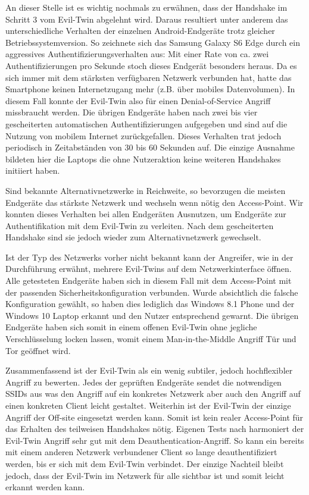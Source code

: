 An dieser Stelle ist es wichtig nochmals zu erwähnen, dass der Handshake im Schritt 3 vom Evil-Twin abgelehnt wird.
Daraus resultiert unter anderem das unterschiedliche Verhalten der einzelnen Android-Endgeräte trotz gleicher Betriebssystemversion.
So zeichnete sich das Samsung Galaxy S6 Edge durch ein aggressives Authentifizierungsverhalten aus: Mit einer Rate von ca. zwei Authentifizierungen pro Sekunde stoch dieses Endgerät besonders heraus.
Da es sich immer mit dem stärksten verfügbaren Netzwerk verbunden hat, hatte das Smartphone keinen Internetzugang mehr (z.B. über mobiles Datenvolumen).
In diesem Fall konnte der Evil-Twin also für einen Denial-of-Service Angriff missbraucht werden.
Die übrigen Endgeräte haben nach zwei bis vier gescheiterten automatischen Authentifizierungen aufgegeben und sind auf die Nutzung von mobilem Internet zurückgefallen.
Dieses Verhalten trat jedoch periodisch in Zeitabständen von 30 bis 60 Sekunden auf.
Die einzige Ausnahme bildeten hier die Laptops die ohne Nutzeraktion keine weiteren Handshakes initiiert haben.

Sind bekannte Alternativnetzwerke in Reichweite, so bevorzugen die meisten Endgeräte das stärkste Netzwerk und wechseln wenn nötig den Access-Point.
Wir konnten dieses Verhalten bei allen Endgeräten Ausnutzen, um Endgeräte zur Authentifikation mit dem Evil-Twin zu verleiten.
Nach dem gescheiterten Handshake sind sie jedoch wieder zum Alternativnetzwerk gewechselt.

Ist der Typ des Netzwerks vorher nicht bekannt kann der Angreifer, wie in der Durchführung erwähnt, mehrere Evil-Twins auf dem Netzwerkinterface öffnen.
Alle getesteten Endgeräte haben sich in diesem Fall mit dem Access-Point mit der passenden Sicherheitskonfiguration verbunden.
Wurde absichtlich die falsche Konfiguration gewählt, so haben dies lediglich das Windows 8.1 Phone und der Windows 10 Laptop erkannt und den Nutzer entsprechend gewarnt. %
Die übrigen Endgeräte haben sich somit in einem offenen Evil-Twin ohne jegliche Verschlüsselung locken lassen, womit einem Man-in-the-Middle Angriff Tür und Tor geöffnet wird.

Zusammenfassend ist der Evil-Twin als ein wenig subtiler, jedoch hochflexibler Angriff zu bewerten.
Jedes der geprüften Endgeräte sendet die notwendigen SSIDs aus was den Angriff auf ein konkretes Netzwerk aber auch den Angriff auf einen konkreten Client leicht gestaltet.
Weiterhin ist der Evil-Twin der einzige Angriff der Off-site eingesetzt werden kann. 
Somit ist kein realer Access-Point für das Erhalten des teilweisen Handshakes nötig.
Eigenen Tests nach harmoniert der Evil-Twin Angriff sehr gut mit dem Deauthentication-Angriff.
So kann ein bereits mit einem anderen Netzwerk verbundener Client so lange deauthentifiziert werden, bis er sich mit dem Evil-Twin verbindet.
Der einzige Nachteil bleibt jedoch, dass der Evil-Twin im Netzwerk für alle sichtbar ist und somit leicht erkannt werden kann.

